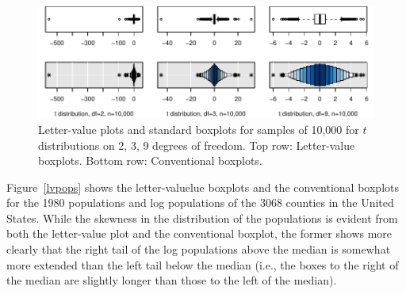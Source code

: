 \documentclass[oneside]{article}
\begin{document}
\begin{figure}[hbtp]
  \centering
  \includegraphics[width = \linewidth]{t-dist}
  
  \caption{Letter-value plots and standard boxplots for samples of 10,000
  for $t$ distributions on 2, 3, 9 degrees of freedom. Top row: Letter-value
  boxplots. Bottom row: Conventional boxplots.}
  \label{t-dist}
\end{figure}

Figure~\ref{lvpops} shows the letter-valuelue boxplots and the conventional boxplots for the 1980 populations and log populations of the 3068 counties in the United States. While the skewness in the distribution of the populations is evident from both the letter-value plot and the conventional boxplot, the former shows more clearly that the right tail of the log populations above the median is somewhat more extended than the left tail below the median (i.e., the boxes to the right of the median are slightly longer than those to the left of the median).
\end{document}

